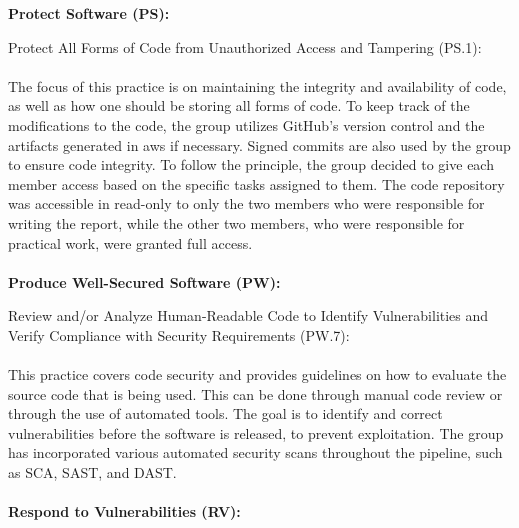 \textbf{Protect Software (PS):}

Protect All Forms of Code from Unauthorized
Access and Tampering (PS.1): \cite{ssdf}
\\~\\
The focus of this practice is on maintaining the integrity and availability of code, as well as how one should be storing all forms of code. To keep track of the modifications to the code, the group utilizes GitHub's version control and the artifacts generated in \acrshort{aws} if necessary. Signed commits are also used by the group to ensure code integrity. To follow the  principle, the group decided to give each member access based on the specific tasks assigned to them. The code repository was accessible in read-only to only the two members who were responsible for writing the report, while the other two members, who were responsible for practical work, were granted full access. 
\\~\\
\textbf{Produce Well-Secured Software (PW):}

Review and/or Analyze Human-Readable
Code to Identify Vulnerabilities and Verify Compliance with Security Requirements (PW.7): \cite{ssdf}
\\~\\
This practice covers code security and provides guidelines on how to evaluate the source code that is being used. This can be done through manual code review or through the use of automated tools.  The goal is to identify and correct vulnerabilities before the software is released, to prevent exploitation. The group has incorporated various automated security scans throughout the pipeline, such as SCA, SAST, and DAST. 
\\~\\
\textbf{Respond to Vulnerabilities (RV):}

